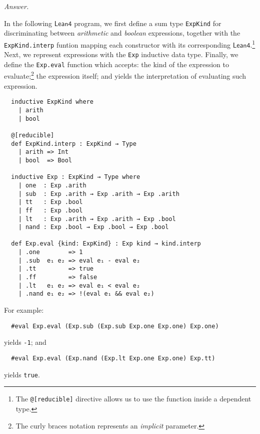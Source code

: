 \documentclass[10pt,justified,nofonts]{tufte-handout}
\newenvironment{answer}[0]{%
  \par\pushQED{\qed}%
  \renewcommand\qedsymbol{$\Box$}%
  \noindent\textit{Answer.}%
  \hspace{.5em}%
}{\popQED\par}
\begin{document}
%
\begin{answer}
  In the following $\mathsf{Lean4}$ program, we first define a sum
  type \texttt{ExpKind} for discriminating between \emph{arithmetic}
  and \emph{boolean} expressions, together with the
  \texttt{ExpKind.interp} funtion mapping each constructor with its
  corresponding $\mathsf{Lean4}$.\footnote{The \texttt{@[reducible]}
    directive allows us to use the function inside a dependent type.}
  Next, we represent expressions with the \texttt{Exp} inductive
  data type.
  Finally, we define the \texttt{Exp.eval} function which
  accepts: the kind of the expression to evaluate;\footnote{The curly braces notation
    represents an \emph{implicit} parameter.} the expression itself; and yields the interpretation
  of evaluating such expression.
  \begin{lstlisting}
  inductive ExpKind where
    | arith
    | bool
  
  @[reducible]
  def ExpKind.interp : ExpKind → Type
    | arith => Int
    | bool  => Bool
  
  inductive Exp : ExpKind → Type where
    | one  : Exp .arith
    | sub  : Exp .arith → Exp .arith → Exp .arith
    | tt   : Exp .bool
    | ff   : Exp .bool
    | lt   : Exp .arith → Exp .arith → Exp .bool
    | nand : Exp .bool → Exp .bool → Exp .bool
  
  def Exp.eval {kind: ExpKind} : Exp kind → kind.interp
    | .one        => 1
    | .sub  e₁ e₂ => eval e₁ - eval e₂
    | .tt         => true
    | .ff         => false
    | .lt   e₁ e₂ => eval e₁ < eval e₂
    | .nand e₁ e₂ => !(eval e₁ && eval e₂)
  \end{lstlisting}
  For example:
  \begin{lstlisting}
  #eval Exp.eval (Exp.sub (Exp.sub Exp.one Exp.one) Exp.one)
  \end{lstlisting}
  yields \texttt{-1}; and
  \begin{lstlisting}
  #eval Exp.eval (Exp.nand (Exp.lt Exp.one Exp.one) Exp.tt)
  \end{lstlisting}
  yields \texttt{true}.
\end{answer}
%


\end{document}
